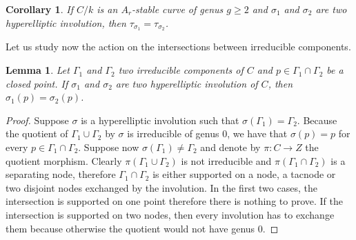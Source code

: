 \documentclass{alggeom}
\numberwithin{equation}{section}
\numberwithin{subsection}{section}
\newtheorem{corollary}[theorem]{Corollary}
\newtheorem{lemma}[theorem]{Lemma}
\theoremstyle{definition}
\theoremstyle{remark}
\begin{document}
\begin{corollary}\label{cor:action-irrcomp}
	 If $C/k$ is an $A_r$-stable curve of genus $g\geq 2$ and $\sigma_1$ and $\sigma_2$ are two hyperelliptic involution, then $\tau_{\sigma_1}=\tau_{\sigma_2}$.
\end{corollary}

Let us study now the action on the intersections between irreducible components.

\begin{lemma}\label{lem:action-intersection}
	Let $\Gamma_1$ and $\Gamma_2$ two irreducible components of $C$ and $p\in \Gamma_1\cap \Gamma_2$ be a closed point. If $\sigma_1$ and $\sigma_2$ are two hyperelliptic involution of $C$, then $\sigma_1(p)=\sigma_2(p)$. 
\end{lemma}
\begin{proof}
 Suppose $\sigma$ is a hyperelliptic involution such that $\sigma(\Gamma_1)=\Gamma_2$. Because the quotient of $\Gamma_1\cup\Gamma_2$ by $\sigma$ is irreducible of genus $0$, we have that $\sigma(p)=p$ for every $p \in \Gamma_1\cap\Gamma_2$. Suppose now $\sigma(\Gamma_1)\neq \Gamma_2$ and denote by $\pi:C\rightarrow Z$ the quotient morphism. Clearly $\pi(\Gamma_1\cup\Gamma_2)$ is not irreducible and $\pi(\Gamma_1\cap\Gamma_2)$ is a separating node, therefore $\Gamma_1\cap\Gamma_2$ is either supported on a node, a tacnode or two disjoint nodes exchanged by the involution. In the first two cases, the intersection is supported on one point therefore there is nothing to prove. If the intersection is supported on two nodes, then every involution has to exchange them because otherwise the quotient would not have genus $0$.
\end{proof}
\end{document}
